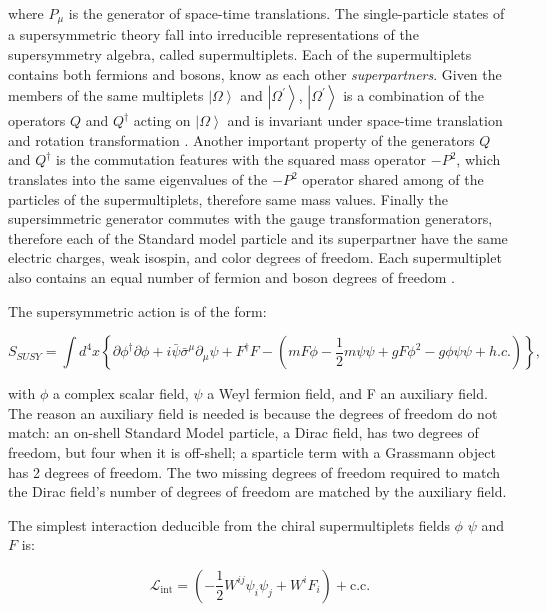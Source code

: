 where $P_{\mu}$ is the generator of space-time translations. The single-particle states of a supersymmetric theory fall into irreducible representations of the supersymmetry algebra, called supermultiplets. Each of the supermultiplets contains both fermions and bosons, know as each other \textit{superpartners}. Given the members of the same multiplets $\left|\Omega\right>$ and $\left|\Omega^{\prime}\right>$, $\left|\Omega^{\prime}\right>$ is a combination of the operators $Q$ and $Q^{\dagger}$ acting on $\left|\Omega\right>$ and is invariant under space-time translation and rotation transformation \cite{Martin:1997ns}. Another important property of the generators $Q$ and $Q^{\dagger}$ is the commutation features with the squared mass operator $-P^{2}$, which translates into the same eigenvalues of the $-P^{2}$ operator shared among of the particles of the supermultiplets, therefore same mass values. Finally the supersimmetric generator commutes with the gauge transformation generators, therefore each of the Standard model particle and its superpartner have  the same electric charges, weak isospin, and color degrees of freedom.
Each supermultiplet also contains an equal number of fermion and boson degrees of freedom \cite{Martin:1997ns}.

The supersymmetric action is of the form:

\begin{equation}
S_{SUSY} =\int d^{4}x\left\{\partial\phi^{\dagger}\partial\phi + i\bar{\psi}\bar{\sigma}^{\mu}\partial_{\mu}\psi + F^{\dagger}F − \left(mF\phi −\dfrac{1}{2}m\psi\psi + gF\phi^{2} − g\phi\psi\psi + h.c.\right)\right\},
\end{equation}

with $\phi$ a complex scalar field, $\psi$ a Weyl fermion field, and F an auxiliary field. The reason an auxiliary field is needed is because the degrees of freedom do not match: an on-shell Standard Model particle, a Dirac field, has two degrees of freedom, but four when it is off-shell; a sparticle term with a Grassmann object \cite{Hatcher:2009} has 2 degrees of freedom. The two missing degrees of freedom required to match the Dirac field’s number of degrees of freedom are matched by the auxiliary field.

The simplest interaction deducible from the chiral supermultiplets fields $\phi$ $\psi$ and $F$ is:

\begin{equation}
\mathcal{L}_{\mathrm{int}} = \left(-\frac{1}{2}W^{ij}\psi_i\psi_j + W^iF_i\right) + \mathrm{c.c.}
\label{eq::linteract}
\end{equation}


